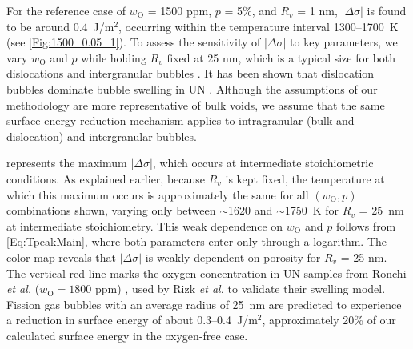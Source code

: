 \documentclass[preprint,12pt,sort&compress]{elsarticle}
\newcommand{\?}{\stackrel{?}{=}}
\begin{document}



For the reference case of $w_\text{O}$ = 1500 ppm, $p$ = 5\%, and $R_v$ = 1 nm, $|\Delta \sigma|$ is found to be around 0.4~J/m$^2$, occurring within the temperature interval 1300--1700~K (see \cref{Fig:1500_0.05_1}). To assess the sensitivity of $|\Delta \sigma|$ to key parameters, we vary $w_\text{O}$ and $p$ while holding $R_v$ fixed at 25 nm, which is a typical size for both dislocations and intergranular bubbles \cite{Colin1983}. It has been shown that dislocation bubbles dominate bubble swelling in UN \cite{Ronchi1975,Ronchi1978,Rizk2025}. Although the assumptions of our methodology are more representative of bulk voids, we assume that the same surface energy reduction mechanism applies to intragranular (bulk and dislocation) and intergranular bubbles.

 represents the maximum $|\Delta \sigma|$, which occurs at intermediate stoichiometric conditions. As explained earlier, because $R_v$ is kept fixed, the temperature at which this maximum occurs is approximately the same for all $(w_\text{O}, p)$ combinations shown, varying only between $\sim$1620 and $\sim$1750~K for $R_v$ = 25~nm at intermediate stoichiometry. This weak dependence on $w_\text{O}$ and $p$ follows from \cref{Eq:TpeakMain}, where both parameters enter only through a logarithm. The color map reveals that $|\Delta \sigma|$ is weakly dependent on porosity for $R_v$ = 25 nm. The vertical red line marks the oxygen concentration in UN samples from Ronchi \textit{et al.} ($w_\text{O} = 1800$ ppm) \cite{Ronchi1975,Ronchi1978}, used by Rizk \textit{et al.} \cite{Rizk2025} to validate their swelling model. Fission gas bubbles with an average radius of 25~nm are predicted to experience a reduction in surface energy of about 0.3--0.4~J/m$^2$, approximately 20\% of our calculated surface energy in the oxygen-free case.
\end{document}
